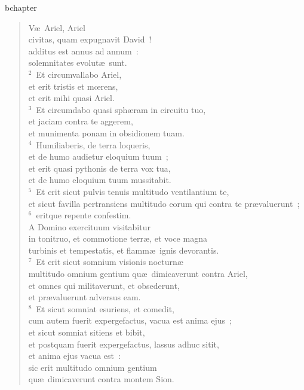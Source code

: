 bchapter\begin{verse}\vspace{-19pt}V\ae\ Ariel, Ariel\\ civitas, quam expugnavit David~!\\ additus est annus ad annum~:\\ solemnitates evolut\ae\ sunt.\\
${}^{2}$~Et circumvallabo Ariel,\\ et erit tristis et mœrens,\\ et erit mihi quasi Ariel.\\
${}^{3}$~Et circumdabo quasi sph\ae ram in circuitu tuo,\\ et jaciam contra te aggerem,\\ et munimenta ponam in obsidionem tuam.\\
${}^{4}$~Humiliaberis, de terra loqueris,\\ et de humo audietur eloquium tuum~;\\ et erit quasi pythonis de terra vox tua,\\ et de humo eloquium tuum mussitabit.\\
${}^{5}$~Et erit sicut pulvis tenuis multitudo ventilantium te,\\ et sicut favilla pertransiens multitudo eorum qui contra te pr\ae valuerunt~;\\
${}^{6}$~eritque repente confestim.\\ A Domino exercituum visitabitur\\ in tonitruo, et commotione terr\ae , et voce magna\\ turbinis et tempestatis, et flamm\ae\ ignis devorantis.\\
${}^{7}$~Et erit sicut somnium visionis nocturn\ae \\ multitudo omnium gentium qu\ae\ dimicaverunt contra Ariel,\\ et omnes qui militaverunt, et obsederunt,\\ et pr\ae valuerunt adversus eam.\\
${}^{8}$~Et sicut somniat esuriens, et comedit,\\ cum autem fuerit expergefactus, vacua est anima ejus~;\\ et sicut somniat sitiens et bibit,\\ et postquam fuerit expergefactus, lassus adhuc sitit,\\ et anima ejus vacua est~:\\ sic erit multitudo omnium gentium\\ qu\ae\ dimicaverunt contra montem Sion.\\

\end{verse}
